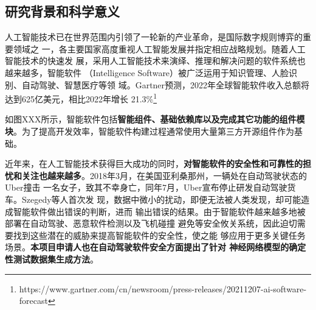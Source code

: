 
\subsection{研究背景和科学意义}



人工智能技术已在世界范围内引领了一轮新的产业革命，是国际数字规则博弈的重要领域之
一，各主要国家高度重视人工智能发展并指定相应战略规划。随着人工智能技术的快速发
展，采用人工智能技术来演绎、推理和解决问题的软件系统也越来越多，智能软件
（Intelligence Software）被广泛运用于知识管理、人脸识别、自动驾驶、智慧医疗等领
域。Gartner预测，2022年全球智能软件收入总额将达到625亿美元，相比2022年增长
21.3\%\footnote{https://www.gartner.com/cn/newsroom/press-releases/20211207-ai-software-forecast}


如图XXX所示，智能软件包括\textbf{智能组件、基础依赖库以及完成其它功能的组件模
块}。为了提高开发效率，智能软件构建过程通常使用大量第三方开源组件作为基础。

近年来，在人工智能技术获得巨大成功的同时，\textbf{对智能软件的安全性和可靠性的担
忧和关注也越来越多}。2018年3月，在美国亚利桑那州，一辆处在自动驾驶状态的Uber撞击
一名女子，致其不幸身亡，同年7月，Uber宣布停止研发自动驾驶货车。Szegedy等人首次发
现，数据中微小的扰动，即便无法被人类发现，却可能造成智能软件做出错误的判断，进而
输出错误的结果。由于智能软件越来越多地被部署在自动驾驶、恶意软件检测以及飞机碰撞
避免等安全攸关系统，因此迫切需要找到这些潜在的威胁来提高智能软件的安全性，使之能
够应用于更多关键任务场景。\textbf{本项目申请人也在自动驾驶软件安全方面提出了针对
神经网络模型的确定性测试数据集生成方法}。 


